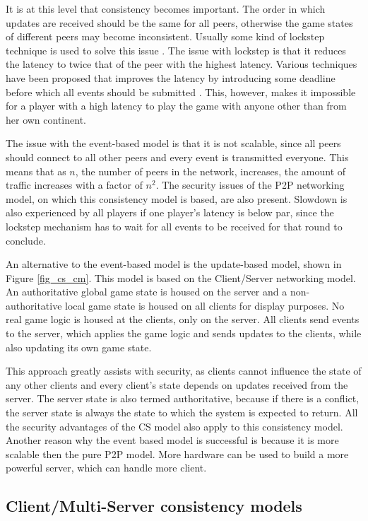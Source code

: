 \documentclass[journal,oneside,a4paper,onecolumn]{IEEEtran}
\begin{document}
It is at this level that consistency becomes important. The order in which updates are received should be the same for all peers, otherwise the game states of different peers may become inconsistent. Usually some kind of lockstep technique is used to solve this issue \cite{pessimistic_lock_step}. The issue with lockstep is that it reduces the latency to twice that of the peer with the highest latency. Various techniques have been proposed that improves the latency by introducing some deadline before which all events should be submitted \cite{cheat_proof_event_ordering}. This, however, makes it impossible for a player with a high latency to play the game with anyone other than from her own continent.

The issue with the event-based model is that it is not scalable, since all peers should connect to all other peers and every event is transmitted everyone. This means that as $n$, the number of peers in the network, increases, the amount of traffic increases with a factor of $n^2$. The security issues of the P2P networking model, on which this consistency model is based, are also present. Slowdown is also experienced by all players if one player's latency is below par, since the lockstep mechanism has to wait for all events to be received for that round to conclude.

An alternative to the event-based model is the update-based model, shown in Figure \ref{fig_cs_cm}. This model is based on the Client/Server networking model. An authoritative global game state is housed on the server and a non-authoritative local game state is housed on all clients for display purposes. No real game logic is housed at the clients, only on the server. All clients send events to the server, which applies the game logic and sends updates to the clients, while also updating its own game state.

This approach greatly assists with security, as clients cannot influence the state of any other clients and every client's state depends on updates received from the server. The server state is also termed authoritative, because if there is a conflict, the server state is always the state to which the system is expected to return. All the security advantages of the \ac{CS} model also apply to this consistency model. Another reason why the event based model is successful is because it is more scalable then the pure P2P model. More hardware can be used to build a more powerful server, which can handle more client.

\subsection{Client/Multi-Server consistency models}
\label{cms_models}
\end{document}
